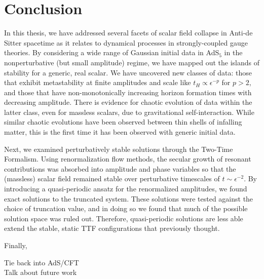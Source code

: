 \documentclass[../PhD.tex]{subfiles}
\begin{document}

\chapter{Conclusion}
\label{ch: conclusion}

In this thesis, we have addressed several facets of scalar field collapse in Anti-de Sitter spacetime as it relates to dynamical processes in strongly-coupled gauge theories. By considering a wide range of Gaussian initial data in AdS$_5$ in the nonperturbative (but small amplitude) regime, we have mapped out the islands of stability for a generic, real scalar. We have uncovered new classes of data: those that exhibit metastability at finite amplitudes and scale like $t_H \propto \epsilon^{-p}$ for $p > 2$, and those that have non-monotonically increasing horizon formation times with decreasing amplitude. There is evidence for chaotic evolution of data within the latter class, even for massless scalars, due to gravitational self-interaction. While similar chaotic evolutions have been observed between thin shells of infalling matter, this is the first time it has been observed with generic initial data.

Next, we examined perturbatively stable solutions through the Two-Time Formalism. Using renormalization flow methods, the secular growth of resonant contributions was absorbed into amplitude and phase variables so that the (massless) scalar field remained stable over perturbative timescales of $t \sim \epsilon^{-2}$. By introducing a quasi-periodic ansatz for the renormalized amplitudes, we found exact solutions to the truncated system. These solutions were tested against the choice of truncation value, and in doing so we found that much of the possible solution space was ruled out. Therefore, quasi-periodic solutions are less able extend the stable, static TTF configurations that previously thought.

Finally, 

Tie back into AdS/CFT \\

Talk about future work \\

\end{document}

